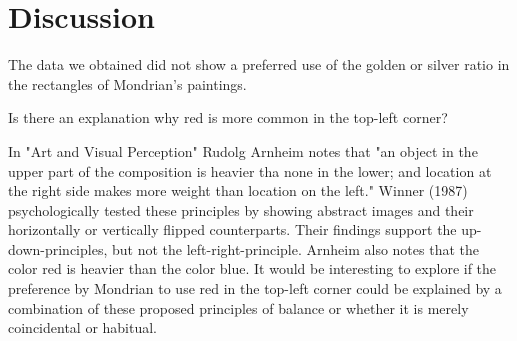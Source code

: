 \section{Discussion} \label{conclusion}




The data we obtained did not show a preferred use of the golden or silver ratio
in the rectangles of Mondrian's paintings.





Is there an explanation why red is more common in the top-left corner?

In "Art and Visual Perception" Rudolg Arnheim \cite{Arnheim1965} notes that "an
object in the upper part of the composition is heavier tha none in the lower;
and location at the right side makes more weight than location on the left."
Winner (1987) \cite{Winner1987} psychologically tested these principles by
showing abstract images and their horizontally or vertically flipped
counterparts. Their findings support the up-down-principles, but not the
left-right-principle. Arnheim also notes that the color red is heavier than the
color blue. It would be interesting to explore if the preference by Mondrian to
use red in the top-left corner could be explained by a combination of these
proposed principles of balance or whether it is merely coincidental or habitual.


